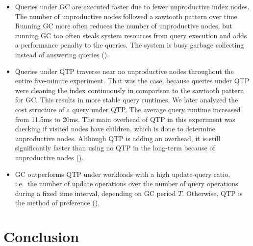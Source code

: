 \documentclass[abstracton,12pt]{scrartcl}
\theoremstyle{definition}
\begin{document}
\begin{itemize}
    \item Queries under GC are executed faster due to fewer unproductive
        index nodes. The number of unproductive nodes followed a sawtooth 
        pattern over time.
        Running GC more often reduces the number of unproductive
        nodes, but running GC too often steals system resources from query
        execution and adds a performance penalty to the queries. The
        system is busy garbage collecting instead of answering queries
        ().


    \item Queries under QTP traverse near no unproductive nodes throughout
        the entire five-minute experiment. That was the case, because queries under
        QTP were cleaning the index continuously in comparison to the
        sawtooth pattern for GC. This results in more stable query runtimes.
        We later analyzed the
        cost structure of a query under QTP. The average query runtime increased
        from 11.5ms to 20ms. The main overhead of QTP in this experiment was 
        checking if visited nodes have children, which is done to 
        determine unproductive nodes. Although QTP is adding an overhead,
        it is still significantly faster than using no QTP in the long-term
        because of unproductive nodes ().

    \item GC outperforms QTP under workloads with a high update-query ratio,
        i.e.\ the number of
        update operations over the number of query operations during
        a fixed time interval,
        depending on GC period $T$. Otherwise, QTP is the method of preference
        ().

\end{itemize}

\newpage

\section{Conclusion}
\end{document}
